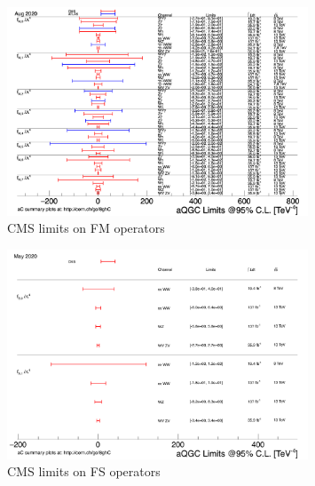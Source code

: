 \begin{figure}[tbp]
\begin{center}
 \includegraphics[width=0.80\textwidth,keepaspectratio]{figures/aQGC/aQGC_fm.png}
\caption{CMS limits on FM operators}
\label{fig:limitFM}
\end{center}
\end{figure}

\begin{figure}[tbp]
\begin{center}
 \includegraphics[width=0.80\textwidth,keepaspectratio]{figures/aQGC/aQGC_fs.png}
\caption{CMS limits on FS operators}
\label{fig:limitFS}
\end{center}
\end{figure}


